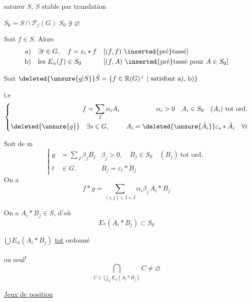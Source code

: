 
  saturer $S$,  $S$ stable par translation

$S_0=S\cap\mathcal P_f(G)$  $S_0\not\ni\varnothing$

Soit $f\in S$. Alors
\[
 \begin{aligned}
 \text{a)}\quad&\exists t\in G,\quad f=\varepsilon_t*f
 &&[(f,f)\ \inserted{\text{pré}}\text{tassé}]\\
 \text{b)}\quad&\text{les } E_\alpha(f)\in S_0
 &&[(f,A)\ \inserted{\text{pré}}\text{tassé pour }A\in S_0]
 \end{aligned}
\]


Soit $\deleted{\unsure{g|S}}\tilde S=\{f\in\mathbb R(G)^+\mid\text{satisfont a), b)}\}$

 i.e
\[
 \left\{\begin{aligned}
 f&=\sum_I\alpha_i A_i&\alpha_i>0\quad A_i\in S_0\quad (A_i)\ \text{tot ord.}\\
 \deleted{\unsure{g}}\quad&\exists s\in G,& A_i=\deleted{\unsure{\check A_i}}\varepsilon_s*\check A_i\quad\forall i
 \end{aligned}\right.
\]

Soit de $\overline{\mathrm m}$
\[
 \left|\begin{aligned}
 g&=\sum_J\beta_j B_j&\beta_j>0,\quad B_j\in S_0\quad (B_j)\ \text{tot ord.}\\
 t&\in G,&B_j=\varepsilon_t*\check B_j
 \end{aligned}\right.
\]
On a
\[
 f*g=\sum_{(i,j)\in I\times J}\alpha_i\beta_j\, A_i*B_j
\]


On a $A_i*B_j\in S$, d'où
\[
 E_*(A_i*B_j)\subset S_0
\]

 $\bigcup E_{\alpha}(A_i*B_j)$ \uline{tot} ordonné

ou seul\textsuperscript{t}
\[
 \bigcap_{C\in\bigcup_{ij}E_\alpha(A_i*B_j)} C\ne\varnothing
\]

\uline{Jeux de position}

